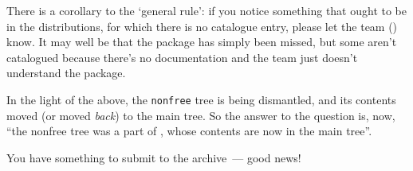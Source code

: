 There is a corollary to the `general rule': if you notice something
that ought to be in the distributions, for which there is no catalogue
entry, please let the  team () know.
It may well be that the package has simply been missed, but some aren't
catalogued because there's no documentation and the team just doesn't
understand the package.

In the light of the above, the \texttt{nonfree} tree is being
dismantled, and its contents moved (or moved \emph{back}) to the main
 tree.  So the answer to the question is, now, ``the
nonfree tree was a part of , whose contents are now in
the main tree''.


You have something to submit to the archive~--- good news!

